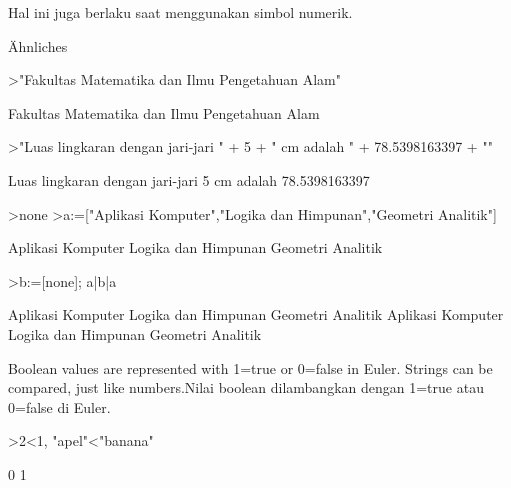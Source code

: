 \documentclass{article}
\begin{document}
\begin{eulernotebook}
\begin{euleroutput}
\end{euleroutput}
\begin{eulercomment}
Hal ini juga berlaku saat menggunakan simbol numerik.
\end{eulercomment}
\begin{euleroutput}
  Ähnliches
\end{euleroutput}
\begin{eulerprompt}
>"Fakultas Matematika dan Ilmu Pengetahuan Alam"
\end{eulerprompt}
\begin{euleroutput}
  Fakultas Matematika dan Ilmu Pengetahuan Alam
\end{euleroutput}
\begin{eulerprompt}
>"Luas lingkaran dengan jari-jari " + 5 + " cm adalah " + 78.5398163397 + ""
\end{eulerprompt}
\begin{euleroutput}
  Luas lingkaran dengan jari-jari 5 cm adalah 78.5398163397
\end{euleroutput}
\begin{eulerprompt}
>none
>a:=["Aplikasi Komputer","Logika dan Himpunan","Geometri Analitik"]
\end{eulerprompt}
\begin{euleroutput}
  Aplikasi Komputer
  Logika dan Himpunan
  Geometri Analitik
\end{euleroutput}
\begin{eulerprompt}
>b:=[none]; a|b|a
\end{eulerprompt}
\begin{euleroutput}
  Aplikasi Komputer
  Logika dan Himpunan
  Geometri Analitik
  Aplikasi Komputer
  Logika dan Himpunan
  Geometri Analitik
\end{euleroutput}
\begin{eulercomment}
Boolean values are represented with 1=true or 0=false in Euler.
Strings can be compared, just like numbers.Nilai boolean dilambangkan
dengan 1=true atau 0=false di Euler. 
\end{eulercomment}
\begin{eulerprompt}
>2<1, "apel"<"banana"
\end{eulerprompt}
\begin{euleroutput}
  0
  1
\end{euleroutput}
\begin{eulercomment}

\end{eulercomment}
\end{eulernotebook}
\end{document}

